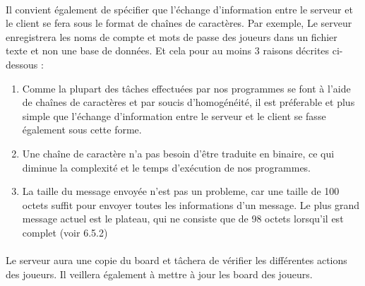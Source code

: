 \documentclass[10pt, a4paper]{article}
\begin{document}
\paragraph{}Il convient également de spécifier que l'échange d'information entre le serveur et le client se fera sous le format de chaînes de caractères. Par exemple, Le serveur enregistrera les noms de compte et mots de passe des joueurs dans un fichier texte et non une base de données. Et cela pour au moins 3 raisons décrites ci-dessous : 
\begin{enumerate}
\item Comme la plupart des tâches effectuées par nos programmes se font à l'aide de chaînes de caractères et par soucis d'homogénéité, il est préferable et plus simple que l'échange d'information entre le serveur et le client se fasse également sous cette forme.
\item Une chaîne de caractère n'a pas besoin d'être traduite en binaire, ce qui diminue la complexité et le temps d'exécution de nos programmes.
\item La taille du message envoyée n'est pas un probleme, car une taille de 100 octets suffit pour envoyer toutes les informations d'un message. Le plus grand message actuel est le plateau, qui ne consiste que de 98 octets lorsqu'il est complet (voir 6.5.2)
\end{enumerate}
\paragraph{}Le serveur aura une copie du board et tâchera de vérifier les différentes actions des joueurs. Il veillera également à mettre à jour les board des joueurs.
\end{document}
